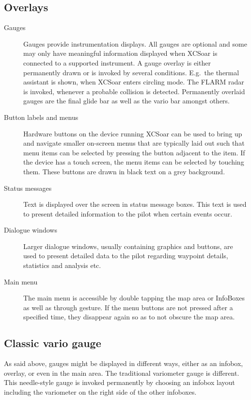 \subsection*{Overlays}
\begin{description}
\item[Gauges]  Gauges provide instrumentation displays. All gauges are optional
and some may only have meaningful information displayed when XCSoar is
connected to a supported instrument.
A gauge overlay is either permanently drawn or is invoked by several 
conditions.  E.g.\ the thermal assistant is shown, when XCSoar enters circling
mode. The FLARM radar is invoked, whenever a probable collision is detected.
Permanently overlaid gauges are the final glide bar as well as the vario bar
amongst others.
\item[Button labels and menus] Hardware buttons on the device running XCSoar
can be used to bring up and navigate smaller on-screen menus that are
typically laid out such that menu items can be selected by pressing the
button adjacent to the item.  If the device has a touch screen, the menu
items can be selected by touching them.  These buttons are drawn in black
text on a grey background.
\item[Status messages] Text is displayed over the screen in status message
boxes.  This text is used to present detailed information to the pilot when
certain events occur.
\item[Dialogue windows] Larger dialogue windows, usually containing graphics and
buttons, are used to present detailed data to the pilot regarding waypoint
details, statistics and analysis etc.
\item[Main menu] The main menu is accessible by double tapping the map area or
InfoBoxes as well as through gesture. If the menu buttons are not pressed after
 a specified time, they disappear again so as to not obscure 
the map area.
\end{description}

\subsection*{Classic vario gauge}
As said above, gauges might be displayed in different ways, either as an 
infobox, overlay, or even in the main area. The traditional variometer gauge is 
different. This needle-style gauge is invoked permanently by choosing an infobox 
layout including the variometer on the right side of the other infoboxes. 

